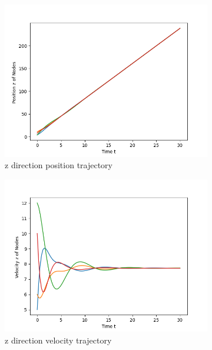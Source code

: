 \documentclass{article}
\begin{document}
\begin{problem}
\begin{figure}[!h]
\begin{subfigure}{0.35\textwidth}
            \includegraphics[width=\textwidth]{./img/p1_5.png}
            \caption{z direction position trajectory}
        \end{subfigure}
        \begin{subfigure}{0.35\textwidth}
            \includegraphics[width=\textwidth]{./img/p1_6.png}
            \caption{z direction velocity trajectory}
        \end{subfigure}
        \begin{subfigure}{0.35\textwidth}

\end{subfigure}
\end{figure}
\end{problem}
\end{document}
